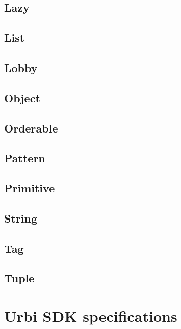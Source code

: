 \documentclass[openright,twoside,12pt]{report}
\newcommand{\urbi}{Urbi\xspace}
\begin{document}
\section{Lazy}
\section{List}
\section{Lobby}
\section{Object}
\section{Orderable}
\section{Pattern}
\section{Primitive}
\section{String}
\section{Tag}
\section{Tuple}

\chapter{\urbi SDK specifications}

\end{document}
